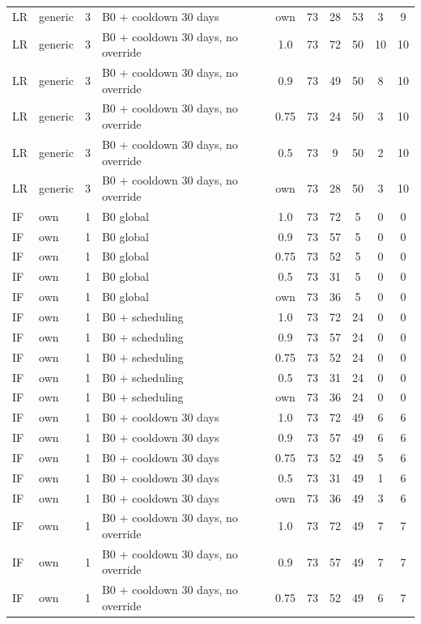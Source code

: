 \begin{longtable}{lllp{4.4cm}cccccc}
LR & generic & 3 & B0 + cooldown 30 days & own & 73 & 28 & 53 & 3 & 9 \\
LR & generic & 3 & B0 + cooldown 30 days, no override & 1.0 & 73 & 72 & 50 & 10 & 10 \\
LR & generic & 3 & B0 + cooldown 30 days, no override & 0.9 & 73 & 49 & 50 & 8 & 10 \\
LR & generic & 3 & B0 + cooldown 30 days, no override & 0.75 & 73 & 24 & 50 & 3 & 10 \\
LR & generic & 3 & B0 + cooldown 30 days, no override & 0.5 & 73 & 9 & 50 & 2 & 10 \\
LR & generic & 3 & B0 + cooldown 30 days, no override & own & 73 & 28 & 50 & 3 & 10 \\
IF & own & 1 & B0 global & 1.0 & 73 & 72 & 5 & 0 & 0 \\
IF & own & 1 & B0 global & 0.9 & 73 & 57 & 5 & 0 & 0 \\
IF & own & 1 & B0 global & 0.75 & 73 & 52 & 5 & 0 & 0 \\
IF & own & 1 & B0 global & 0.5 & 73 & 31 & 5 & 0 & 0 \\
IF & own & 1 & B0 global & own & 73 & 36 & 5 & 0 & 0 \\
IF & own & 1 & B0 + scheduling & 1.0 & 73 & 72 & 24 & 0 & 0 \\
IF & own & 1 & B0 + scheduling & 0.9 & 73 & 57 & 24 & 0 & 0 \\
IF & own & 1 & B0 + scheduling & 0.75 & 73 & 52 & 24 & 0 & 0 \\
IF & own & 1 & B0 + scheduling & 0.5 & 73 & 31 & 24 & 0 & 0 \\
IF & own & 1 & B0 + scheduling & own & 73 & 36 & 24 & 0 & 0 \\
IF & own & 1 & B0 + cooldown 30 days & 1.0 & 73 & 72 & 49 & 6 & 6 \\
IF & own & 1 & B0 + cooldown 30 days & 0.9 & 73 & 57 & 49 & 6 & 6 \\
IF & own & 1 & B0 + cooldown 30 days & 0.75 & 73 & 52 & 49 & 5 & 6 \\
IF & own & 1 & B0 + cooldown 30 days & 0.5 & 73 & 31 & 49 & 1 & 6 \\
IF & own & 1 & B0 + cooldown 30 days & own & 73 & 36 & 49 & 3 & 6 \\
IF & own & 1 & B0 + cooldown 30 days, no override & 1.0 & 73 & 72 & 49 & 7 & 7 \\
IF & own & 1 & B0 + cooldown 30 days, no override & 0.9 & 73 & 57 & 49 & 7 & 7 \\
IF & own & 1 & B0 + cooldown 30 days, no override & 0.75 & 73 & 52 & 49 & 6 & 7 \\

\end{longtable}
